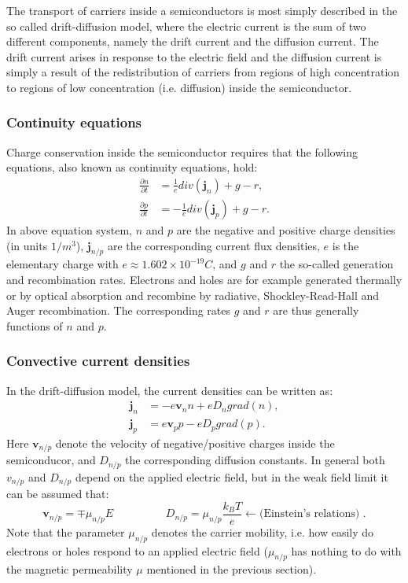 The transport of carriers inside a semiconductors is most simply described in
the so called drift-diffusion model, where the electric current is the sum of
two different components, namely the drift current and the diffusion current.
The drift current arises in response to the electric field and the diffusion
current is simply a result of the redistribution of carriers from regions of
high concentration to regions of low concentration (i.e. diffusion) inside the semiconductor.

\subsubsection{Continuity equations\newline }

Charge conservation inside the semiconductor requires that the following
equations, also known as continuity equations, hold:
\begin{align}
\frac{\partial n}{\partial t}  &  =\frac{1}{e}div\left(  \mathbf{j}%
_{n}\right)  +g-r,\label{eq:continuity_n_charge}\\
\frac{\partial p}{\partial t}  &  =-\frac{1}{e}div\left(  \mathbf{j}%
_{p}\right)  +g-r. \label{eq:continuity_p_charge}%
\end{align}
In above equation system, $n$ and $p$ are the negative and positive charge
densities (in units $1/m^{3}$), $\mathbf{j}_{n/p}$ are the corresponding
current flux densities, $e$ is the elementary charge with $e\approx
1.602\times10^{-19}C$, and $g$ and $r$ the so-called generation and
recombination rates. Electrons and holes are for example generated thermally
or by optical absorption and recombine by radiative, Shockley-Read-Hall and
Auger recombination. The corresponding rates $g$ and $r$ are thus generally
functions of $n$ and $p$.

\subsubsection{Convective current densities\newline }

In the drift-diffusion model, the current densities can be written as:
\begin{align}
\mathbf{j}_{n}  &  =-e\mathbf{v}_{n}n+eD_{n}grad\left(  n\right)  ,\nonumber\\
\mathbf{j}_{p}  &  =e\mathbf{v}_{p}p-eD_{p}grad\left(  p\right)  .
\label{eq:jnp}%
\end{align}
Here $\mathbf{v}_{n/p}$ denote the velocity of negative/positive charges
inside the semiconducor, and $D_{n/p}$ the corresponding diffusion constants.
In general both $v_{n/p}$ and $D_{n/p}$ depend on the applied electric field,
but in the weak field limit it can be assumed that:
\[
\mathbf{v}_{n/p}=\mp\mu_{n/p}E\hspace{2cm}D_{n/p}=\mu_{n/p}\frac{k_{B}T}%
{e}\leftarrow\text{(Einstein's relations) }.
\]
Note that the parameter $\mu_{n/p}$ denotes the carrier mobility, i.e. how
easily do electrons or holes respond to an applied electric field ($\mu_{n/p}$
has nothing to do with the magnetic permeability $\mu$ mentioned in the
previous section).

